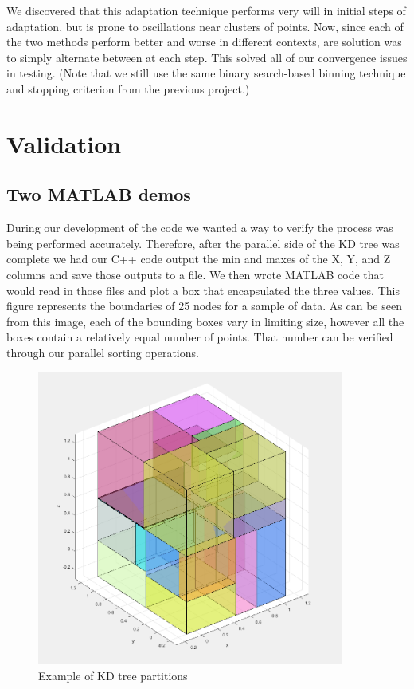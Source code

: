 \documentclass{article}
\begin{document}
We discovered that this adaptation technique performs very will in initial steps of adaptation, but is prone to oscillations near clusters of points. Now, since each of the two methods perform better and worse in different contexts, are solution was to simply alternate between at each step. This solved all of our convergence issues in testing. (Note that we still use the same binary search-based binning technique and stopping criterion from the previous project.)





\section{Validation}


\subsection{Two MATLAB demos}
During our development of the code we wanted a way to verify the process was being performed accurately. Therefore, after the parallel side of the KD tree was complete we had our C++ code output the min and maxes of the X, Y, and Z columns and save those outputs to a file. We then wrote MATLAB code that would read in those files and plot a box that encapsulated the three values. This figure represents the boundaries of 25 nodes for a sample of data. As can be seen from this image, each of the bounding boxes vary in limiting size, however all the boxes contain a relatively equal number of points. That number can be verified through our parallel sorting operations. 

\begin{figure}
\includegraphics[width=0.9\textwidth]{images/squares.png}
\caption{Example of KD tree partitions}
\end{figure}
\end{document}
